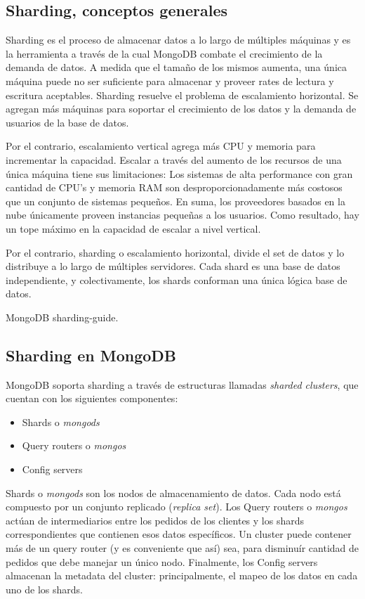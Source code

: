 \subsection{Sharding, conceptos generales}

Sharding es el proceso de almacenar datos a lo largo de múltiples máquinas y es la herramienta a través de la 
cual MongoDB combate el crecimiento de la demanda de datos. A medida que el tama\~no de los mismos aumenta,
una única máquina puede no ser suficiente para almacenar y proveer rates de lectura y escritura aceptables.
Sharding resuelve el problema de escalamiento horizontal. Se agregan más máquinas para soportar el crecimiento
de los datos y la demanda de usuarios de la base de datos.

Por el contrario, escalamiento vertical agrega más CPU y memoria para incrementar la capacidad. Escalar a través
del aumento de los recursos de una única máquina tiene sus limitaciones: Los sistemas de alta performance con
gran cantidad de CPU's y memoria RAM son desproporcionadamente más costosos que un conjunto de sistemas 
peque\~nos. En suma, los proveedores basados en la nube únicamente proveen instancias peque\~nas a los
usuarios. Como resultado, hay un tope máximo en la capacidad de escalar a nivel vertical.

Por el contrario, sharding o escalamiento horizontal, divide el set de datos y lo distribuye a lo largo de 
múltiples servidores. Cada shard es una base de datos independiente, y colectivamente, los shards conforman
una única lógica base de datos.

MongoDB sharding-guide.

\subsection{Sharding en MongoDB}

MongoDB soporta sharding a través de estructuras llamadas \emph{sharded clusters},
que cuentan con los siguientes componentes:

\begin{itemize}
	\item Shards o \emph{mongods}
	\item Query routers o \emph{mongos}
	\item Config servers 
\end{itemize}

Shards o \emph{mongods} son los nodos de almacenamiento de datos. Cada nodo está compuesto por un 
conjunto replicado (\emph{replica set}). 
Los Query routers o \emph{mongos} actúan de intermediarios entre los pedidos de los clientes y los shards correspondientes
que contienen esos datos específicos. Un cluster puede contener más de un query router (y es conveniente que así) sea,
para disminuír cantidad de pedidos que debe manejar un único nodo.
Finalmente, los Config servers almacenan la metadata del cluster: principalmente, el mapeo de los datos en cada uno de los
shards.

